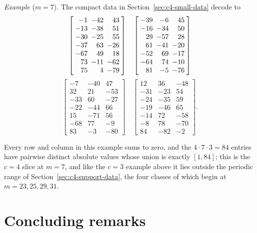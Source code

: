 \begin{center}
\emph{Example} ($m=7$). The compact data in Section~\ref{sec:c4-small-data} decode to
{\footnotesize
\[
\setlength{\arraycolsep}{2.5pt}
\left[\begin{array}{rrr}
-1&-42&43\\-13&-38&51\\-30&-25&55\\-37&63&-26\\-67&49&18\\73&-11&-62\\75&4&-79
\end{array}\right]\quad
\left[\begin{array}{rrr}
-39&-6&45\\-16&-34&50\\29&-57&28\\61&-41&-20\\-52&69&-17\\-64&74&-10\\81&-5&-76
\end{array}\right]
\]
\[
\left[\begin{array}{rrr}
-7&-40&47\\32&21&-53\\-33&60&-27\\-22&-44&66\\15&-71&56\\-68&77&-9\\83&-3&-80
\end{array}\right]\quad
\left[\begin{array}{rrr}
12&36&-48\\-31&-23&54\\-24&-35&59\\-19&-46&65\\-14&72&-58\\-8&78&-70\\84&-82&-2
\end{array}\right].
\]
}
\end{center}

Every row and column in this example sums to zero, and the $4\cdot7\cdot3=84$ entries have pairwise
distinct absolute values whose union is exactly $[1,84]$; this is the $c=4$ slice at $m=7$, and
like the $c=3$ example above it lies outside the periodic range of Section~\ref{sec:c4-support-data},
the four classes of which begin at $m=23,25,29,31$.



\section{Concluding remarks}\label{sec:remarks}

